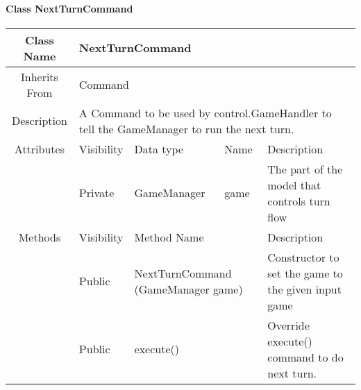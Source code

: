 \paragraph{Class NextTurnCommand}\mbox{}
\begin{tabularx}{\textwidth}{|c||l|l|l|X|}
    \hline
    \cellcolor{lightgray}Class Name & \multicolumn{4}{X|}{NextTurnCommand}\\
    \hline
    \cellcolor{lightgray}Inherits From & \multicolumn{4}{X|}{Command}\\
    \hline
    \cellcolor{lightgray}Description & \multicolumn{4}{p{12cm}|}{A Command to be used by control.GameHandler to tell the GameManager to run the next turn.}\\
    \hline\hline
    
    \cellcolor{lightgray}Attributes & \cellcolor{lightgray}Visibility & \cellcolor{lightgray}Data type & \cellcolor{lightgray}Name & \cellcolor{lightgray}Description\\\cline{2-5}
    \cellcolor{lightgray} & Private & GameManager & game & The part of the model that controls turn flow\\
    \hline\hline
    
    \cellcolor{lightgray}Methods & \cellcolor{lightgray}Visibility & \multicolumn{2}{l|}{\cellcolor{lightgray}Method Name} & \cellcolor{lightgray}Description\\\cline{2-5}
    \cellcolor{lightgray} & Public & \multicolumn{2}{X|}{NextTurnCommand (GameManager game)} & Constructor to set the game to the given input game\\\cline{2-5}
    \cellcolor{lightgray} & Public & \multicolumn{2}{l|}{execute()} & Override execute() command to do next turn.\\
    \hline
\end{tabularx}